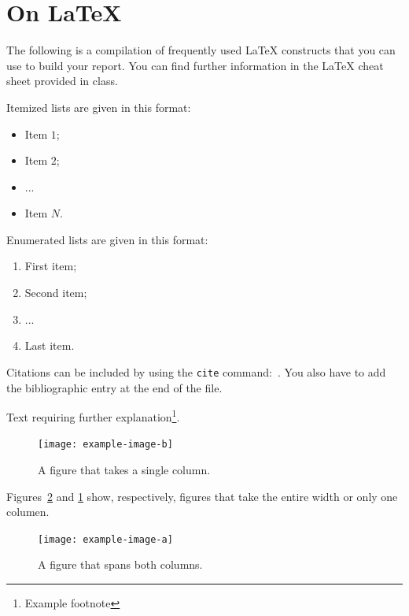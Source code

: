 \documentclass[twoside,twocolumn,10pt]{article}
\begin{document}

\section{On \LaTeX{}}

The following is a compilation of frequently used \LaTeX{} constructs that you can use to build your report. You can find further information in the \LaTeX{} cheat sheet provided in class.

Itemized lists are given in this format:
\begin{itemize}
\item Item $1$;
\item Item $2$;
\item ...
\item Item $N$.
\end{itemize}

Enumerated lists are given in this format:
\begin{enumerate}
\item First item;
\item Second item;
\item ...
\item Last item.
\end{enumerate}

Citations can be included by using the \texttt{cite} command:~\cite{Figueredo:2009dg}. You also have to add the bibliographic entry at the end of the file.

Text requiring further explanation\footnote{Example footnote}.

\begin{figure}[!ht]
  \centering
  \texttt{[image: example-image-b]}
  \caption{A figure that takes a single column.}
  \label{fig:label_B}
\end{figure}


Figures~\ref{fig:label_A} and \ref{fig:label_B} show, respectively, figures that take the entire width or only one columen.

\begin{figure}
  \centering
  \texttt{[image: example-image-a]}
  \caption{A figure that spans both columns.}
  \label{fig:label_A}
\end{figure}
\end{document}
